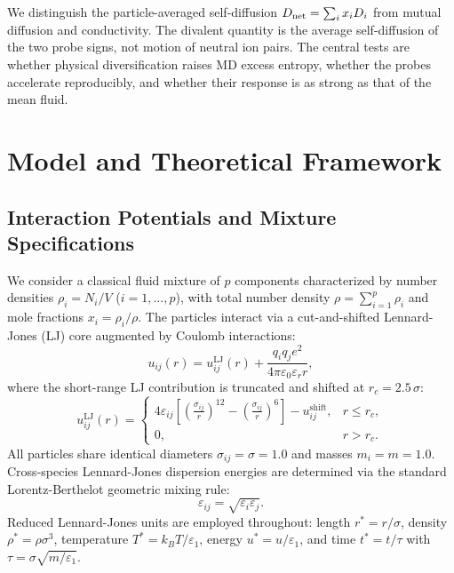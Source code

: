 \documentclass[aps,pre,twocolumn,superscriptaddress,floatfix]{revtex4-2}
\begin{document}
We distinguish the particle-averaged self-diffusion $D_{\rm net}=\sum_i x_iD_i$ from mutual diffusion and conductivity. The divalent quantity is the average self-diffusion of the two probe signs, not motion of neutral ion pairs. The central tests are whether physical diversification raises MD excess entropy, whether the probes accelerate reproducibly, and whether their response is as strong as that of the mean fluid.

\section{Model and Theoretical Framework}

\subsection{Interaction Potentials and Mixture Specifications}

We consider a classical fluid mixture of $p$ components characterized by number densities $\rho_i = N_i / V$ ($i = 1, \dots, p$), with total number density $\rho = \sum_{i=1}^p \rho_i$ and mole fractions $x_i = \rho_i / \rho$. The particles interact via a cut-and-shifted Lennard-Jones (LJ) core augmented by Coulomb interactions:
\begin{equation}
u_{ij}(r) = u_{ij}^{\text{LJ}}(r) + \frac{q_i q_j e^2}{4\pi \varepsilon_0 \varepsilon_r r},
\label{eq:total_potential}
\end{equation}
where the short-range LJ contribution is truncated and shifted at $r_c = 2.5\,\sigma$:
\begin{equation}
u_{ij}^{\text{LJ}}(r) = 
\begin{cases}
4\varepsilon_{ij} \left[ \left(\frac{\sigma_{ij}}{r}\right)^{12} - \left(\frac{\sigma_{ij}}{r}\right)^6 \right] - u_{ij}^{\text{shift}}, & r \le r_c, \\
0, & r > r_c.
\end{cases}
\end{equation}
All particles share identical diameters $\sigma_{ij} = \sigma = 1.0$ and masses $m_i = m = 1.0$. Cross-species Lennard-Jones dispersion energies are determined via the standard Lorentz-Berthelot geometric mixing rule:
\begin{equation}
\varepsilon_{ij} = \sqrt{\varepsilon_i \varepsilon_j}.
\end{equation}
Reduced Lennard-Jones units are employed throughout: length $r^* = r/\sigma$, density $\rho^* = \rho \sigma^3$, temperature $T^* = k_B T / \varepsilon_1$, energy $u^* = u/\varepsilon_1$, and time $t^* = t / \tau$ with $\tau = \sigma \sqrt{m/\varepsilon_1}$.
\end{document}
